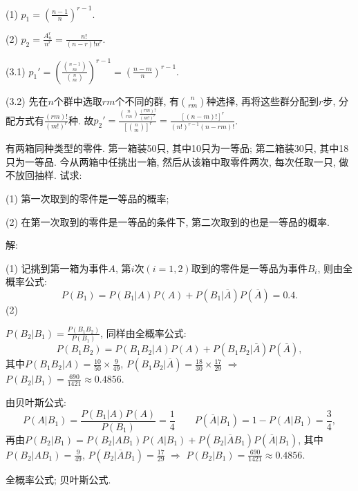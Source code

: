 \documentclass[standard]{ExBook}
\renewenvironment{shaded}{%
  \def\FrameCommand{\fboxsep=\FrameSep \colorbox{shadecolor}}%
  \MakeFramed{\advance\hsize-\width \FrameRestore}%
}{%
  \endMakeFramed
}
\begin{document}
\begin{qitems}
(1) $p_{1}=(\frac{n-1}{n})^{r-1}$.

(2) $p_{2}=\frac{A_{n}^{r}}{n^r}=\frac{n!}{(n-r)!n^r}$.

(3.1) $p_{1}'=(\frac{\binom{n-1}{m}}{\binom{n}{m}})^{r-1}=(\frac{n-m}{n})^{r-1}$.

(3.2) 先在$n$个群中选取$rm$个不同的群, 有$\binom{n}{rm}$种选择, 再将这些群分配到$r$步, 分配方式有$\frac{(rm)!}{(m!)^{r}}$种. 故$p_{2}'=\displaystyle\frac{\binom{n}{rm}\frac{(rm)!}{(m!)^{r}}}{[\binom{n}{m}]^{r}}=\frac{[(n-m)!]^{r}}{(n!)^{r-1}(n-rm)!}$.

\vspace{2.5cm-5em}

    \begin{bbox}
    \begin{shaded}
        \qitem
有两箱同种类型的零件. 第一箱装50只, 其中10只为一等品; 第二箱装30只, 其中18只为一等品. 今从两箱中任挑出一箱, 然后从该箱中取零件两次, 每次任取一只, 做不放回抽样. 试求:

(1) 第一次取到的零件是一等品的概率;

(2) 在第一次取到的零件是一等品的条件下, 第二次取到的也是一等品的概率.
    \end{shaded}
    \end{bbox}

\vspace{\dimexpr2.5cm-5em\relax}

解: 

(1) 记挑到第一箱为事件$A$, 第$i$次$(i=1,2)$取到的零件是一等品为事件$B_{i}$, 则由全概率公式:
$$P(B_{1})=P(B_{1}|A)P(A)+P(B_{1}|\overline{A})P(\overline{A})=0.4.$$
(2)

 $P(B_{2}|B_{1})=\frac{P(B_{1}B_{2})}{P(B_{1})}$, 同样由全概率公式:
$$P(B_{1}B_{2})=P(B_{1}B_{2}|A)P(A)+P(B_{1}B_{2}|\overline{A})P(\overline{A}),$$
其中$P(B_{1}B_{2}|A)=\frac{10}{50}\times\frac{9}{49}$, $P(B_{1}B_{2}|\overline{A})=\frac{18}{30}\times\frac{17}{29}$ $\Longrightarrow$ $P(B_{2}|B_{1})=\frac{690}{1421}\approx0.4856$.

 由贝叶斯公式:
$$P(A|B_{1})=\frac{P(B_{1}|A)P(A)}{P(B_{1})}=\frac{1}{4}\qquad P(\overline{A}|B_{1})=1-P(A|B_{1})=\frac{3}{4},$$
再由$P(B_{2}|B_{1})=P(B_{2}|AB_{1})P(A|B_{1})+P(B_{2}|\overline{A}B_{1})P(\overline{A}|B_{1})$, 其中$P(B_{2}|AB_{1})=\frac{9}{49}$, $P(B_{2}|\overline{A}B_{1})=\frac{17}{29}$ $\Longrightarrow$ $P(B_{2}|B_{1})=\frac{690}{1421}\approx0.4856$.

\textcolor{themeColor}{\selectfont {} 全概率公式; 贝叶斯公式.}


\end{qitems}
\end{document}
